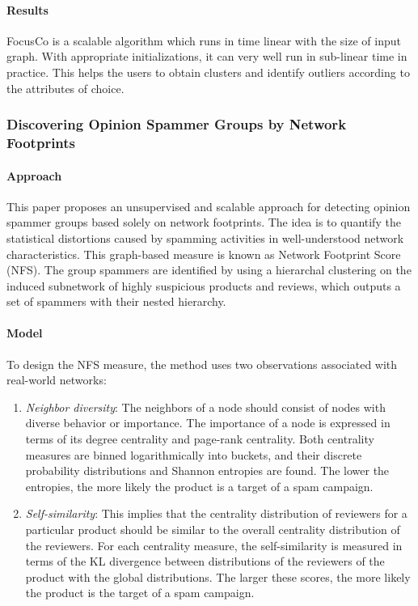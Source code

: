 \documentclass[11pt, oneside]{article}   	%
\begin{document}
\paragraph{Results}
\quad

\quad FocusCo is a scalable algorithm which runs in time linear with the size of input graph.
With appropriate initializations, it can very well run in sub-linear time in practice.
This helps the users to obtain clusters and identify outliers according to the attributes of choice.

\subsubsection{Discovering Opinion Spammer Groups by Network Footprints}

\paragraph{Approach}
\quad

\quad This paper \cite{dosgnf} proposes an unsupervised and scalable approach for detecting opinion spammer groups based solely on network footprints.
The idea is to quantify the statistical distortions caused by spamming activities in well-understood network characteristics.
This graph-based measure is known as Network Footprint Score (NFS).
The group spammers are identified by using a hierarchal clustering on the induced subnetwork of highly suspicious products and reviews, which outputs a set of spammers with their nested hierarchy.

\paragraph{Model}
\quad

To design the NFS measure, the method uses two observations associated with real-world networks:

\begin{enumerate}
\item \emph{Neighbor diversity}: The neighbors of a node should consist of nodes with diverse behavior or importance.
The importance of a node is expressed in terms of its degree centrality and page-rank centrality.
Both centrality measures are binned logarithmically into buckets, and their discrete probability distributions and Shannon entropies are found.
The lower the entropies, the more likely the product is a target of a spam campaign.
\item \emph{Self-similarity}: This implies that the centrality distribution of reviewers for a particular product should be similar to the overall centrality distribution of the reviewers.
For each centrality measure, the self-similarity is measured in terms of the KL divergence between distributions of the reviewers of the product with the global distributions.
The larger these scores, the more likely the product is the target of a spam campaign.
\end{enumerate}
\end{document}
